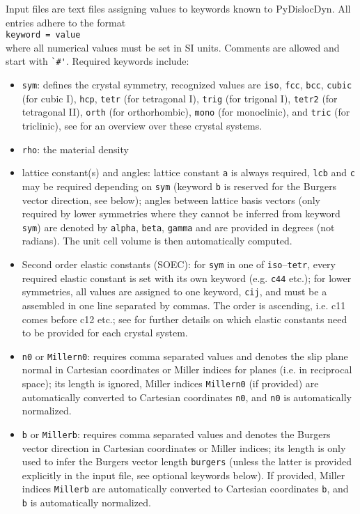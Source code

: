 \documentclass[11pt,letterpaper,oneside,pdftex]{article}
\begin{document}
Input files are text files assigning values to keywords known to PyDislocDyn.
All entries adhere to the format
\\\verb|keyword = value|\\
where all numerical values must be set in SI units.
Comments are allowed and start with \verb|`#'|.
Required keywords include:
\begin{itemize}
\item \verb|sym|: defines the crystal symmetry, recognized values are \verb|iso|, \verb|fcc|, \verb|bcc|, \verb|cubic| (for cubic I), \verb|hcp|, \verb|tetr| (for tetragonal I), \verb|trig| (for trigonal I), \verb|tetr2| (for tetragonal II), \verb|orth| (for orthorhombic), \verb|mono| (for monoclinic), and \verb|tric| (for triclinic), see \cite{Brugger:1965} for an overview over these crystal systems.

\item \verb|rho|: the material density

\item lattice constant(s) and angles: lattice constant \verb|a| is always required, \verb|lcb| and \verb|c| may be required depending on \verb|sym| (keyword \verb|b| is reserved for the Burgers vector direction, see below); angles between lattice basis vectors (only required by lower symmetries where they cannot be inferred from keyword \verb|sym|) are denoted by \verb|alpha|, \verb|beta|, \verb|gamma| and are provided in degrees (not radians).
The unit cell volume is then automatically computed.

\item Second order elastic constants (SOEC): for \verb|sym| in one of \verb|iso|--\verb|tetr|, every required elastic constant is set with its own keyword (e.g. \verb|c44| etc.);
for lower symmetries, all values are assigned to one keyword, \verb|cij|, and must be a assembled in one line separated by commas.
The order is ascending, i.e. c11 comes before c12 etc.; see \cite{Brugger:1965} for further details on which elastic constants need to be provided for each crystal system.

\item \verb|n0| or \verb|Millern0|: requires comma separated values and denotes the slip plane normal in Cartesian coordinates or Miller indices for planes (i.e. in reciprocal space); its length is ignored, Miller indices \verb|Millern0| (if provided) are automatically converted to Cartesian coordinates \verb|n0|, and \verb|n0| is automatically normalized.

\item \verb|b| or \verb|Millerb|: requires comma separated values and denotes the Burgers vector direction in Cartesian coordinates or Miller indices; its length is only used to infer the Burgers vector length \verb|burgers| (unless the latter is provided explicitly in the input file, see optional keywords below).
If provided, Miller indices \verb|Millerb| are automatically converted to Cartesian coordinates \verb|b|, and \verb|b| is automatically normalized.
\end{itemize}
\end{document}
